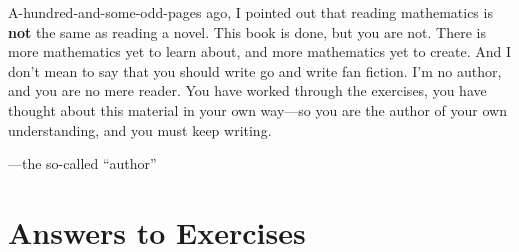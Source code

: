 \documentclass[justified]{tufte-book}
\begin{document}
 A-hundred-and-some-odd-pages ago, I pointed out
 that reading mathematics is \textbf{not} the same as reading a novel.
 This book is done, but you are not.  There is more mathematics yet to
 learn about, and more mathematics yet to create.  And I don't mean to
 say that you should write go and write fan fiction.  I'm no author,
 and you are no mere reader.  You have worked through the exercises,
 you have thought about this material in your own way---so you are the
 author of your own understanding, and you must keep writing.

\vspace{0.5in}
\hfill---the so-called ``author''

%
%

\finalizeanswers
\chapter*{Answers to Exercises}
\small
{}
\normalsize
\backmatter

\printindex
\end{document}
